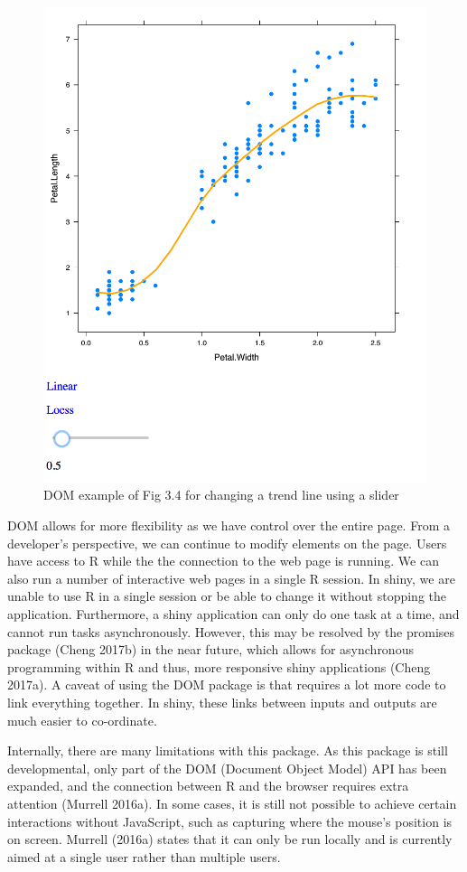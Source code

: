 \documentclass[11pt,]{report}
\begin{document}
\begin{figure}[H]

{\centering \includegraphics[width=0.5\linewidth,]{./fig/tl-DOM-2} 

}

\caption{\label{fig:tl-DOM-2} DOM example of Fig 3.4 for changing a trend line using a slider}\label{fig:unnamed-chunk-45}
\end{figure}

\textsf{DOM} allows for more flexibility as we have control over the
entire page. From a developer's perspective, we can continue to modify
elements on the page. Users have access to R while the the connection to
the web page is running. We can also run a number of interactive web
pages in a single R session. In \textsf{shiny}, we are unable to use R
in a single session or be able to change it without stopping the
application. Furthermore, a \textsf{shiny} application can only do one
task at a time, and cannot run tasks asynchronously. However, this may
be resolved by the \textsf{promises} package (Cheng 2017b) in the near
future, which allows for asynchronous programming within R and thus,
more responsive \textsf{shiny} applications (Cheng 2017a). A caveat of
using the \textsf{DOM} package is that requires a lot more code to link
everything together. In \textsf{shiny}, these links between inputs and
outputs are much easier to co-ordinate.

Internally, there are many limitations with this package. As this
package is still developmental, only part of the \textsf{DOM} (Document
Object Model) API has been expanded, and the connection between R and
the browser requires extra attention (Murrell 2016a). In some cases, it
is still not possible to achieve certain interactions without
JavaScript, such as capturing where the mouse's position is on screen.
Murrell (2016a) states that it can only be run locally and is currently
aimed at a single user rather than multiple users.
\end{document}
